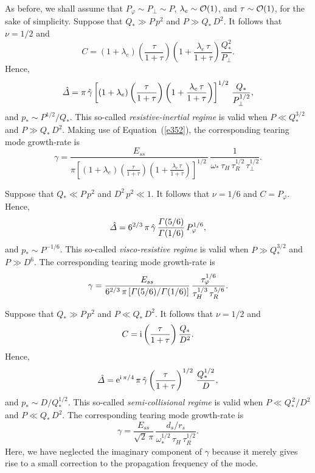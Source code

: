 \documentclass[notitlepage,12pt]{article}
\begin{document}
As before, we shall assume that $P_\varphi\sim P_\perp \sim P$, $\lambda_e\sim{\cal O}(1)$, and $\tau\sim {\cal O}(1)$, for
the sake of simplicity. 
Suppose that $Q_\ast\gg P\,p^2$ and $P\gg Q_\ast\,D^2$. It follows that $\nu=1/2$ and
\begin{equation}
C = (1+\lambda_e)\left(\frac{\tau}{1+\tau}\right)\left(1+\frac{\lambda_e\,\tau}{1+\tau}\right)\frac{Q_\ast^{2}}{P_\perp}.
\end{equation}
Hence, 
\begin{equation}
\hat{\mit\Delta} = \pi\,\hat{\gamma}\left[ (1+\lambda_e)\left(\frac{\tau}{1+\tau}\right)\left(1+\frac{\lambda_e\,\tau}{1+\tau}\right)\right]^{1/2}\,\frac{Q_\ast}{P_\perp^{1/2}},
\end{equation}
and $p_\ast\sim P^{1/2}/Q_\ast$. This so-called {\em resistive-inertial regime}\/ is valid when $P\ll Q_\ast^{3/2}$ and
$P\gg Q_\ast\,D^2$. 
Making use of Equation~(\ref{e352}), the corresponding tearing mode growth-rate is
\begin{equation}\label{e363}
\gamma = \frac{E_{ss}}{\pi\left[ (1+\lambda_e)\left(\frac{\tau}{1+\tau}\right)\left(1+\frac{\lambda_e\,\tau}{1+\tau}\right)\right]^{1/2}\,}\,\frac{1}{\omega_\ast\,\tau_H\,\tau_R^{1/2}\,\tau_\perp^{1/2}}.
\end{equation}

Suppose that $Q_\ast \ll P\,p^2$ and $D^2\,p^2\ll 1$. 
It follows that $\nu=1/6$ and
$C = P_\varphi$. 
Hence, 
\begin{equation}
\hat{\mit\Delta} = 6^{2/3}\,\pi\,\hat{\gamma}\, \frac{{\mit\Gamma}(5/6)}{{\mit\Gamma}(1/6)}\,P_\varphi^{1/6}, 
\end{equation}
and $p_\ast\sim P^{-1/6}$. This so-called {\em visco-resistive regime}\/ is valid when $P\gg Q_\ast^{3/2}$ and
$P\gg D^6$. 
The corresponding tearing mode growth-rate is
\begin{equation}\label{e365}
\gamma = \frac{E_{ss}}{6^{2/3}\,\pi\,[{\mit\Gamma}(5/6)/{\mit\Gamma}(1/6)]}\,\frac{\tau_\varphi^{1/6}}{\tau_H^{1/3}\,\tau_R^{5/6}}.
\end{equation}

Suppose that $Q_\ast\gg P\,p^2$ and $P\ll Q_\ast\,D^2$. It follows that $\nu=1/2$ and
\begin{equation}
C = {\rm i}\left(\frac{\tau}{1+\tau}\right)\frac{Q_\ast}{D^2}.
\end{equation} 
Hence, 
\begin{equation}
\hat{\mit\Delta} = {\rm e}^{{\rm i}\,\pi/4}\,\pi\,\hat{\gamma}\left(\frac{\tau}{1+\tau}\right)^{1/2}\,\frac{Q_\ast^{1/2}}{D},
\end{equation}
and $p_\ast\sim D/Q_\ast^{1/2}$. This so-called {\em semi-collisional regime}\/ is valid when $P\ll Q_\ast^{\,2}/D^2$ and
$P\ll Q_\ast\,D^2$. 
The corresponding tearing mode growth-rate is
\begin{equation}\label{e368}
\gamma = \frac{E_{ss}}{\sqrt{2}\,\pi}\,\frac{d_s/r_s}{\omega_\ast^{1/2}\,\tau_H\,\tau_R^{1/2}}.
\end{equation}
Here, we have neglected the imaginary component of $\gamma$ because it merely gives rise to a small correction to the
propagation frequency of the mode. 
\end{document}
